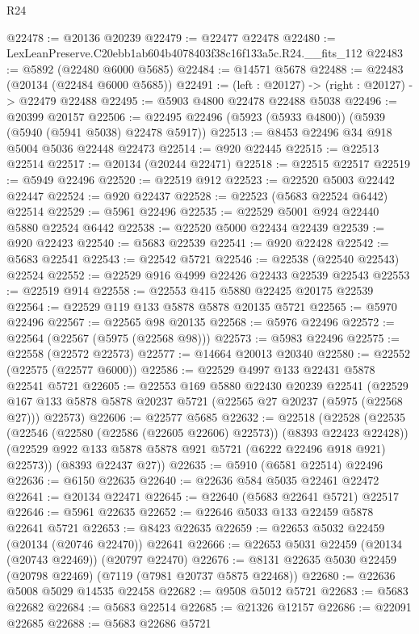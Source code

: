 \begin{lexlean}{R24}
\begin{coremodule}
@22478 := @20136 @20239
@22479 := @22477 @22478
@22480 := LexLeanPreserve.C20ebb1ab604b4078403f38c16f133a5c.R24.__fits_112
@22483 := @5892 (@22480 @6000 @5685)
@22484 := @14571 @5678
@22488 := @22483 (@20134 (@22484 @6000 @5685))
@22491 := (left : @20127) -> (right : @20127) -> @22479 @22488
@22495 := @5903 @4800 @22478 @22488 @5038
@22496 := @20399 @20157
@22506 := @22495 @22496 (@5923 (@5933 @4800)) (@5939 (@5940 (@5941 @5038) @22478 @5917))
@22513 := @8453 @22496 @34 @918 @5004 @5036 @22448 @22473
@22514 := @920 @22445
@22515 := @22513 @22514
@22517 := @20134 (@20244 @22471)
@22518 := @22515 @22517
@22519 := @5949 @22496
@22520 := @22519 @912
@22523 := @22520 @5003 @22442 @22447
@22524 := @920 @22437
@22528 := @22523 (@5683 @22524 @6442) @22514
@22529 := @5961 @22496
@22535 := @22529 @5001 @924 @22440 @5880 @22524 @6442
@22538 := @22520 @5000 @22434 @22439
@22539 := @920 @22423
@22540 := @5683 @22539
@22541 := @920 @22428
@22542 := @5683 @22541
@22543 := @22542 @5721
@22546 := @22538 (@22540 @22543) @22524
@22552 := @22529 @916 @4999 @22426 @22433 @22539 @22543
@22553 := @22519 @914
@22558 := @22553 @415 @5880 @22425 @20175 @22539
@22564 := @22529 @119 @133 @5878 @5878 @20135 @5721
@22565 := @5970 @22496
@22567 := @22565 @98 @20135
@22568 := @5976 @22496
@22572 := @22564 (@22567 (@5975 (@22568 @98)))
@22573 := @5983 @22496
@22575 := @22558 (@22572 @22573)
@22577 := @14664 @20013 @20340
@22580 := @22552 (@22575 (@22577 @6000))
@22586 := @22529 @4997 @133 @22431 @5878 @22541 @5721
@22605 := @22553
    @169
    @5880
    @22430
    @20239
    @22541
    (@22529 @167 @133 @5878 @5878 @20237 @5721 (@22565 @27 @20237 (@5975 (@22568 @27))) @22573)
@22606 := @22577 @5685
@22632 := @22518
    (@22528
      (@22535
        (@22546 (@22580 (@22586 (@22605 @22606) @22573)) (@8393 @22423 @22428))
        (@22529 @922 @133 @5878 @5878 @921 @5721 (@6222 @22496 @918 @921) @22573))
      (@8393 @22437 @27))
@22635 := @5910 (@6581 @22514) @22496
@22636 := @6150 @22635
@22640 := @22636 @584 @5035 @22461 @22472
@22641 := @20134 @22471
@22645 := @22640 (@5683 @22641 @5721) @22517
@22646 := @5961 @22635
@22652 := @22646 @5033 @133 @22459 @5878 @22641 @5721
@22653 := @8423 @22635
@22659 := @22653 @5032 @22459 (@20134 (@20746 @22470)) @22641
@22666 := @22653 @5031 @22459 (@20134 (@20743 @22469)) (@20797 @22470)
@22676 := @8131 @22635 @5030 @22459 (@20798 @22469) (@7119 (@7981 @20737 @5875 @22468))
@22680 := @22636 @5008 @5029 @14535 @22458
@22682 := @9508 @5012 @5721
@22683 := @5683 @22682
@22684 := @5683 @22514
@22685 := @21326 @12157
@22686 := @22091 @22685
@22688 := @5683 @22686 @5721

\end{coremodule}
\end{lexlean}

